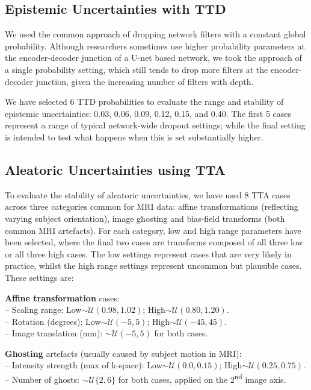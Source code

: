 \documentclass[runningheads]{llncs}
\begin{document}
\subsection{Epistemic Uncertainties with TTD}
\label{subsec:TTD}

We used the common approach of dropping network filters with a constant global probability. Although researchers sometimes use higher probability parameters at the encoder-decoder junction of a U-net based network, we took the approach of a single probability setting, which still tends to drop more filters at the encoder-decoder junction, given the increasing number of filters with depth.

We have selected 6 TTD probabilities to evaluate the range and stability of epistemic uncertainties: 0.03, 0.06, 0.09, 0.12, 0.15, and 0.40. The first 5 cases represent a range of typical network-wide dropout settings; while the final setting is intended to test what happens when this is set substantially higher.

\subsection{Aleatoric Uncertainties using TTA}
\label{subsec:TTA}

To evaluate the stability of aleatoric uncertainties, we have used 8 TTA cases across three categories common for MRI data: affine transformations (reflecting varying subject orientation), image ghosting and bias-field transforms (both common MRI artefacts). For each category, low and high range parameters have been selected, where the final two cases are transforms composed of all three low or all three high cases. The low settings represent cases that are very likely in practice, whilst the high range settings represent uncommon but plausible cases. These settings are:

\noindent
\textbf{Affine transformation} cases:\\
\hspace*{0.5cm} -- Scaling range: Low$\sim\mathcal{U}(0.98,1.02)$; High$\sim\mathcal{U}(0.80,1.20)$.\\
\hspace*{0.5cm} -- Rotation (degrees): Low$\sim\mathcal{U}(-5,5)$; High$\sim\mathcal{U}(-45, 45)$.\\
\hspace*{0.5cm} -- Image translation (mm): $\sim\mathcal{U}(-5, 5)$ for both cases.

\noindent
\textbf{Ghosting} artefacts (usually caused by subject motion in MRI):\\
\hspace*{0.5cm} -- Intensity strength (max of k-space): Low$\sim\mathcal{U}(0.0,0.15)$; High$\sim\mathcal{U}(0.25,0.75)$.\\
\hspace*{0.5cm} -- Number of ghosts: $\sim\mathcal{U}\{2, 6\}$ for both cases, applied on the 2\textsuperscript{nd} image axis.
\end{document}
